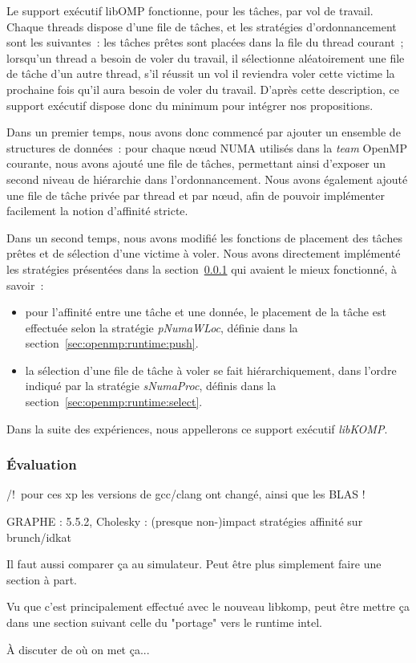 Le support exécutif libOMP fonctionne, pour les tâches, par vol de travail.
Chaque threads dispose d'une file de tâches, et les stratégies d'ordonnancement sont les suivantes~: les tâches prêtes sont placées dans la file du thread courant~; lorsqu'un thread a besoin de voler du travail, il sélectionne aléatoirement une file de tâche d'un autre thread, s'il réussit un vol il reviendra voler cette victime la prochaine fois qu'il aura besoin de voler du travail.
D'après cette description, ce support exécutif dispose donc du minimum pour intégrer nos propositions.

Dans un premier temps, nous avons donc commencé par ajouter un ensemble de structures de données~: pour chaque nœud NUMA utilisés dans la \emph{team} OpenMP courante, nous avons ajouté une file de tâches, permettant ainsi d'exposer un second niveau de hiérarchie dans l'ordonnancement.
Nous avons également ajouté une file de tâche privée par thread et par nœud, afin de pouvoir implémenter facilement la notion d'affinité stricte.

Dans un second temps, nous avons modifié les fonctions de placement des tâches prêtes et de sélection d'une victime à voler.
Nous avons directement implémenté les stratégies présentées dans la section~\ref{} qui avaient le mieux fonctionné, à savoir~:
\begin{itemize}
  \item pour l'affinité entre une tâche et une donnée, le placement de la tâche est effectuée selon la stratégie \emph{pNumaWLoc}, définie dans la section~\ref{sec:openmp:runtime:push}.
  \item la sélection d'une file de tâche à voler se fait hiérarchiquement, dans l'ordre indiqué par la stratégie \emph{sNumaProc}, définis dans la section~\ref{sec:openmp:runtime:select}.
\end{itemize}

Dans la suite des expériences, nous appellerons ce support exécutif \emph{libKOMP}.

\subsubsection{Évaluation}

/!\ pour ces xp les versions de gcc/clang ont changé, ainsi que les BLAS !

\begin{todo}
GRAPHE : 5.5.2, Cholesky : (presque non-)impact stratégies affinité sur brunch/idkat
\end{todo}


\begin{todo}
  Il faut aussi comparer ça au simulateur. Peut être plus simplement faire une section à part.

  Vu que c'est principalement effectué avec le nouveau libkomp, peut être mettre ça dans une section suivant celle du "portage" vers le runtime intel.

  À discuter de où on met ça...
\end{todo}


